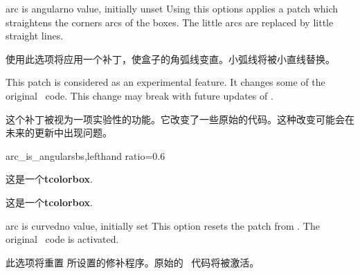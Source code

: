 \begin{docTcbKey}[][doc new=2015-05-05]{arc is angular}{}{no value, initially unset}
  Using this options applies a patch which straightens the corners arcs of
  the boxes. The little arcs are replaced by little straight lines.
  

  使用此选项将应用一个补丁，使盒子的角弧线变直。小弧线将被小直线替换。
  \begin{marker}
  This patch is considered as an experimental feature.
  It changes some of the original \tikzname\ code. This change may break
  with future updates of \tikzname.
  
  这个补丁被视为一项实验性的功能。它改变了一些原始的\tikzname 代码。这种改变可能会在未来的\tikzname 更新中出现问题。
  \end{marker}
  
  \begin{exdispExample*}{arc_is_angular}{sbs,lefthand ratio=0.6}
  
  \begin{tcolorbox}
  这是一个\textbf{tcolorbox}.
  \end{tcolorbox}
  \begin{tcolorbox}
  这是一个\textbf{tcolorbox}.
  \end{tcolorbox}
  \end{exdispExample*}
  
  \end{docTcbKey}
  
  
\begin{docTcbKey}[][doc new=2015-05-05]{arc is curved}{}{no value, initially set}
This option resets the patch from . The
original \tikzname\ code is activated.


此选项将重置  所设置的修补程序。原始的 \tikzname\ 代码将被激活。
\end{docTcbKey}


